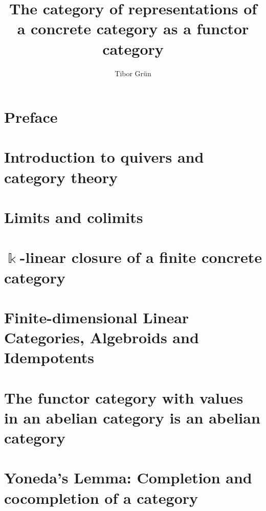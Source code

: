 \documentclass{article}
\title{The category of representations of a concrete category as a functor category}
\author{Tibor Gr{\"u}n}
\begin{document}

	\maketitle

	\newpage

	\tableofcontents\label{toc}
	
	\newpage

	
\section*{Preface}

\section{Introduction to quivers and category theory}


\section{Limits and colimits}


\section{$\Bbbk$-linear closure of a finite concrete category}


\section{Finite-dimensional Linear Categories, Algebroids and Idempotents}


\section{The functor category with values in an abelian category is an abelian category}


\section{Yoneda's Lemma: Completion and cocompletion of a category}

\end{document}
